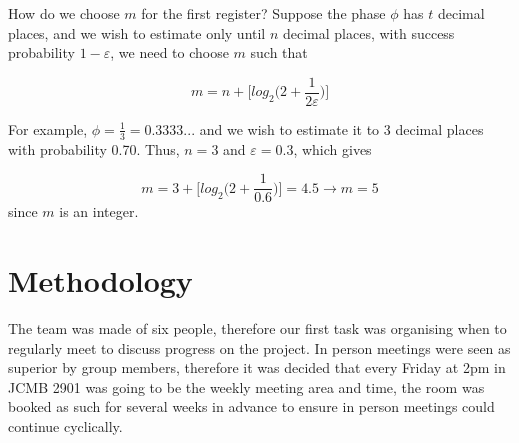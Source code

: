 \documentclass{article}
\begin{document}
\vspace{10mm} 

\noindent 
How do we choose $m$ for the first register? Suppose the phase $\phi$ has $t$ decimal places, and we wish to estimate only until $n$ decimal places, with success probability $1-\varepsilon$, we need to choose $m$ such that \cite{nielsen_quantum_2010}
\vspace{5mm}

\begin{equation}
m=n+\bigg[log_2\bigg(2+\frac{1}{2\varepsilon}\bigg)\bigg]    
\end{equation}

For example, $\phi = \frac{1}{3} = 0.3333...$ and we wish to estimate it to 3 decimal places with probability 0.70. Thus, $n=3$ and $\varepsilon = 0.3$, which gives 
\vspace{5mm}

\begin{equation}
m = 3 + \bigg[log_2\bigg(2+\frac{1}{0.6}\bigg)\bigg]=4.5 \rightarrow m=5    
\end{equation} since $m$ is an integer.

\pagebreak

\section{Methodology}

The team was made of six people, therefore our first task was organising when to regularly meet to discuss progress on the project. In person meetings were seen as superior by group members, therefore  it was decided that every Friday at 2pm in JCMB 2901 was going to be the weekly meeting area and time, the room was booked as such for several weeks in advance to ensure in person meetings could continue cyclically.
\end{document}
